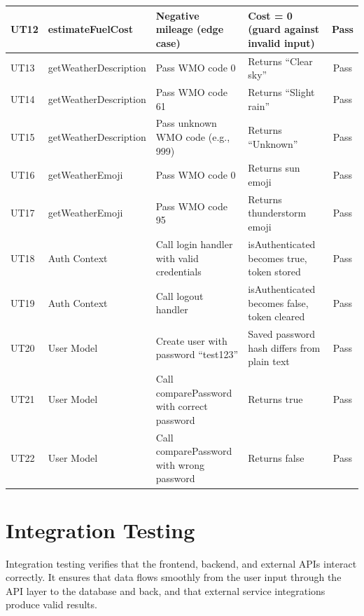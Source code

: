 \begin{longtable}{|p{1.2cm}|p{2.5cm}|p{4cm}|p{4cm}|c|}
    UT12 & estimateFuelCost & Negative mileage (edge case) & Cost = 0 (guard against invalid input) & Pass \\
    \hline
    UT13 & getWeatherDescription & Pass WMO code 0 & Returns ``Clear sky'' & Pass \\
    \hline
    UT14 & getWeatherDescription & Pass WMO code 61 & Returns ``Slight rain'' & Pass \\
    \hline
    UT15 & getWeatherDescription & Pass unknown WMO code (e.g., 999) & Returns ``Unknown'' & Pass \\
    \hline
    UT16 & getWeatherEmoji & Pass WMO code 0 & Returns sun emoji & Pass \\
    \hline
    UT17 & getWeatherEmoji & Pass WMO code 95 & Returns thunderstorm emoji & Pass \\
    \hline
    UT18 & Auth Context & Call login handler with valid credentials & isAuthenticated becomes true, token stored & Pass \\
    \hline
    UT19 & Auth Context & Call logout handler & isAuthenticated becomes false, token cleared & Pass \\
    \hline
    UT20 & User Model & Create user with password ``test123'' & Saved password hash differs from plain text & Pass \\
    \hline
    UT21 & User Model & Call comparePassword with correct password & Returns true & Pass \\
    \hline
    UT22 & User Model & Call comparePassword with wrong password & Returns false & Pass \\
    \hline
\end{longtable}

\section{Integration Testing}
Integration testing verifies that the frontend, backend, and external APIs interact correctly. It ensures that data flows smoothly from the user input through the API layer to the database and back, and that external service integrations produce valid results.

